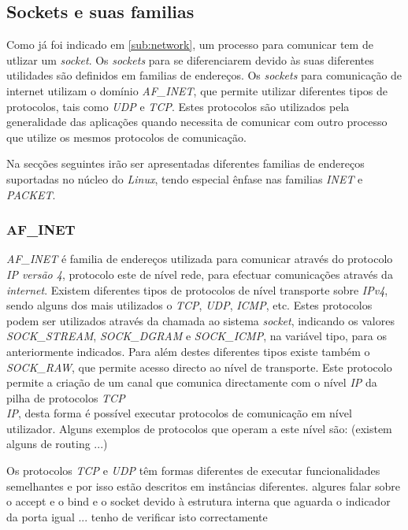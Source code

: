 \subsection{Sockets e suas familias}
\label{sub:sockets}

Como já foi indicado em \ref{sub:network}, um processo para comunicar tem de utlizar um \textit{socket}.
 Os \textit{sockets} para se diferenciarem devido às suas diferentes utilidades são definidos em  familias de endereços.
 Os \textit{sockets} para comunicação de internet utilizam o domínio \textit{AF\_INET}, que permite utilizar diferentes tipos de protocolos, tais como \textit{UDP} e \textit{TCP}.
 Estes protocolos são utilizados pela generalidade das aplicações quando necessita de comunicar com outro processo que utilize os mesmos protocolos de comunicação.

Na secções seguintes irão ser apresentadas diferentes familias de endereços suportadas no núcleo do \textit{Linux}, tendo especial ênfase nas familias \textit{INET} e \textit{PACKET}.


\subsubsection{AF\_INET}
\label{subsub:af_inet}

\textit{AF\_INET} é familia de endereços utilizada para comunicar através do protocolo \textit{IP versão 4}, protocolo este de nível rede, para efectuar comunicações através da \textit{internet}.
 Existem diferentes tipos de protocolos de nível transporte sobre \textit{IPv4}, sendo alguns dos mais utilizados o \textit{TCP}, \textit{UDP}, \textit{ICMP}, etc.
 Estes protocolos podem ser utilizados através da chamada ao sistema \textit{socket}, indicando os valores \textit{SOCK\_STREAM}, \textit{SOCK\_DGRAM} e \textit{SOCK\_ICMP}, na variável tipo, para os anteriormente indicados.
 Para além destes diferentes tipos existe também o \textit{SOCK\_RAW}, que permite acesso directo ao nível de transporte.
 Este protocolo permite a criação de um canal que comunica directamente com o nível \textit{IP} da pilha de protocolos \textit{TCP\\IP}, desta forma é possível executar protocolos de comunicação em nível utilizador.
 Alguns exemplos de protocolos que operam a este nível são: (existem alguns de routing ...)


Os protocolos \textit{TCP} e \textit{UDP} têm formas diferentes de executar funcionalidades semelhantes e por isso estão descritos em instâncias diferentes.
algures falar sobre o accept e o bind e o socket devido à estrutura interna que aguarda o indicador da porta igual ... tenho de verificar isto correctamente

